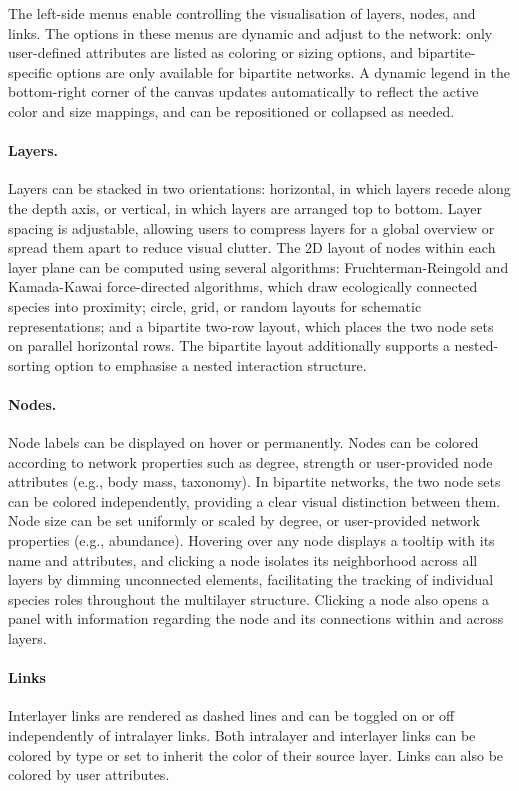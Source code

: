 \documentclass{article}
\begin{document}
The left-side menus enable controlling the visualisation of layers, nodes, and links. The options in these menus are dynamic and adjust to the network: only user-defined attributes are listed as coloring or sizing options, and bipartite-specific options are only available for bipartite networks. A dynamic legend in the bottom-right corner of the canvas updates automatically to reflect the active color and size mappings, and can be repositioned or collapsed as needed.

\paragraph{Layers.} Layers can be stacked in two orientations: horizontal, in which layers recede along the depth axis, or vertical, in which layers are arranged top to bottom. Layer spacing is adjustable, allowing users to compress layers for a global overview or spread them apart to reduce visual clutter.
The 2D layout of nodes within each layer plane can be computed using several algorithms: Fruchterman-Reingold and Kamada-Kawai force-directed algorithms, which draw ecologically connected species into proximity; circle, grid, or random layouts for schematic representations; and a bipartite two-row layout, which places the two node sets on parallel horizontal rows. The bipartite layout additionally supports a nested-sorting option to emphasise a nested interaction structure. 

\paragraph{Nodes.} Node labels can be displayed on hover or permanently. Nodes can be colored according to network properties such as degree, strength or user-provided node attributes (e.g., body mass, taxonomy). In bipartite networks, the two node sets can be colored independently, providing a clear visual distinction between them. Node size can be set uniformly or scaled by degree, or user-provided network properties (e.g., abundance). Hovering over any node displays a tooltip with its name and attributes, and clicking a node isolates its neighborhood across all layers by dimming unconnected elements, facilitating the tracking of individual species roles throughout the multilayer structure. Clicking a node also opens a panel with information regarding the node and its connections within and across layers.

\paragraph{Links} Interlayer links are rendered as dashed lines and can be toggled on or off independently of intralayer links. Both intralayer and interlayer links can be colored by type or set to inherit the color of their source layer. Links can also be colored by user attributes.
\end{document}
